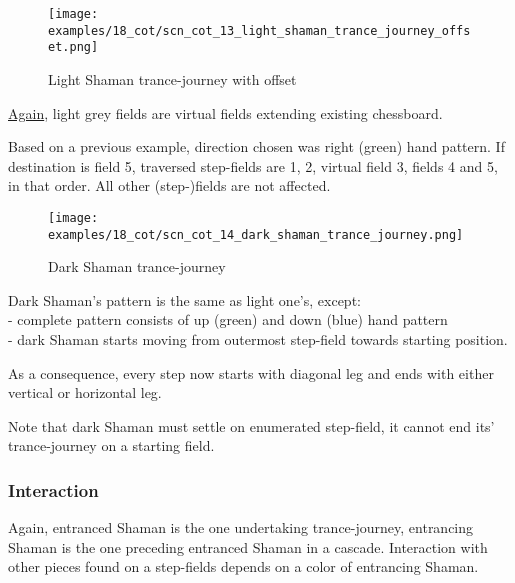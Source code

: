 \noindent
\begin{figure}[!h]
\texttt{[image: examples/18\_cot/scn\_cot\_13\_light\_shaman\_trance\_journey\_offset.png]}
\caption{Light Shaman trance-journey with offset}
\label{fig:scn_cot_13_light_shaman_trance_journey_offset}
\end{figure}

\hyperref[fig:scn_hd_04_centaur_off_board]{Again},
light grey fields are virtual fields extending existing chessboard.

Based on a previous example, direction chosen was right (green) hand pattern.
If destination is field 5, traversed step-fields are 1, 2, virtual field 3,
fields 4 and 5, in that order. All other (step-)fields are not affected.

\clearpage %

\noindent
\begin{figure}[!h]
\texttt{[image: examples/18\_cot/scn\_cot\_14\_dark\_shaman\_trance\_journey.png]}
\caption{Dark Shaman trance-journey}
\label{fig:scn_cot_14_dark_shaman_trance_journey}
\end{figure}

Dark Shaman's pattern is the same as light one's, except: \\
- complete pattern consists of up (green) and down (blue) hand pattern \\
- dark Shaman starts moving from outermost step-field towards starting position.

As a consequence, every step now starts with diagonal leg and ends with either
vertical or horizontal leg.


Note that dark Shaman must settle on enumerated step-field, it cannot end its'
trance-journey on a starting field.

\subsubsection*{Interaction}

Again, entranced Shaman is the one undertaking trance-journey, entrancing Shaman
is the one preceding entranced Shaman in a cascade. Interaction with other pieces
found on a step-fields depends on a color of entrancing Shaman.

